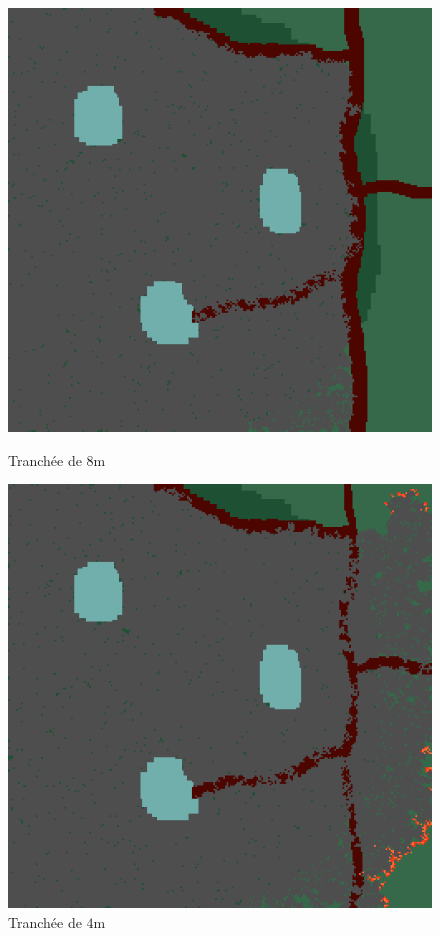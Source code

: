 \documentclass[12pt]{article}
\begin{document}
\begin{figure}[!ht]
    \centering
    \begin{minipage}{0.35\textwidth}
      \centering
      \includegraphics[width=.8\linewidth]{pictures/trans/treach.png}
      \caption{Tranchée de $8$m}\label{Fig:Data9}
    \end{minipage}\hfil
    \begin{minipage}{0.35\textwidth}
      \centering
      \includegraphics[width=.8\linewidth]{pictures/trans/little_treach.png}
      \caption{Tranchée de $4$m}\label{Fig:Data10}
    \end{minipage}
\end{figure}
\end{document}
